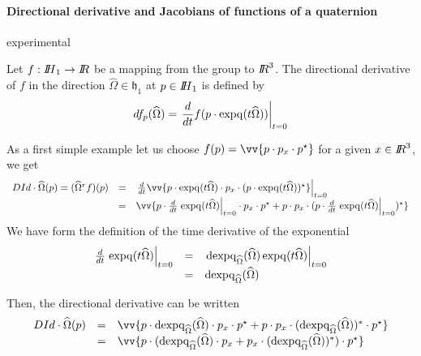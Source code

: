 \paragraph{Directional derivative and Jacobians of functions of a quaternion}
\begin{ndrva}
  experimental
\end{ndrva}

Let $f : \mbox{\rm $I\!\!H$}_1 \rightarrow \mbox{\rm $I\!\!R$} $ be a mapping from the group to $\mbox{\rm $I\!\!R$}^3$. The directional derivative of $f$ in the direction $\widehat \Omega \in \mathfrak h_1$ at $p\in \mbox{\rm $I\!\!H$}_1$ is 
defined by
\begin{equation}
  \label{eq:139}
 df_p(\widehat \Omega) =\left. \frac{d}{dt} f(p\cdot \operatorname{expq}(t\widehat \Omega)) \right|_{t=0}
\end{equation}

As a first simple example let us choose $f(p) = \vv{p \glaw p_x \glaw p^\star}$ for a given $x \in \mbox{\rm $I\!\!R$}^3 $, we get
\begin{equation}
  \label{eq:142}
  \begin{array}{lcl}
    D Id \cdot \widehat \Omega (p) = (\widehat \Omega^r f )(p) &=& \left. \frac{d}{dt}\vv{p\glaw \expq(t\widehat \Omega) \glaw p_x \glaw (p \glaw \expq(t\widehat \Omega))^\star}  \right|_{t=0}\\
                                                               & = & \vv{p\glaw \frac{d}{dt}\left. \expq(t\widehat \Omega) \right|_{t=0} \glaw p_x \glaw p^\star +  p \glaw p_x \glaw (p \glaw\frac{d}{dt}\left. \expq(t\widehat \Omega) \right|_{t=0})^\star}\\                                              
  \end{array}
\end{equation}
We have form the definition of the time derivative of the exponential
\begin{equation}
  \label{eq:143}
  \begin{array}{lcl}
    \frac{d}{dt}\left. \operatorname{expq}(t\widehat \Omega) \right|_{t=0} &=&  \left. \operatorname{dexpq}_{\widehat\Omega}(\widehat \Omega)\operatorname{expq}(t\widehat \Omega) \right|_{t=0} \\
                                                            &=&  \operatorname{dexpq}_{\widehat\Omega}(\widehat \Omega)
  \end{array}
\end{equation}

Then, the directional derivative can be written
\begin{equation}
  \label{eq:146}
  \begin{array}{lcl}
    D Id \cdot \widehat \Omega (p) &=& \vv{p\glaw \dexpq_{\widehat\Omega}(\widehat \Omega)\glaw p_x \glaw p^\star  + p \glaw p_x \glaw (\dexpq_{\widehat\Omega}(\widehat \Omega))^* \glaw  p^\star } \\
  &=& \vv{p\glaw ( \dexpq_{\widehat\Omega}(\widehat \Omega)\glaw p_x +   p_x \glaw (\dexpq_{\widehat\Omega}(\widehat \Omega))^*) \glaw  p^\star } 
  \end{array}
\end{equation}




